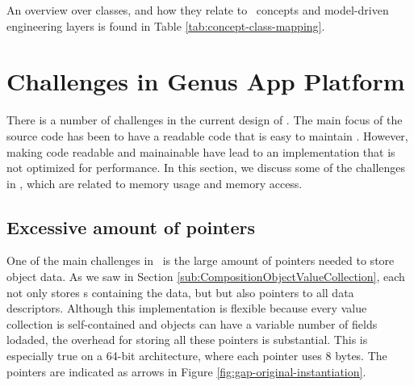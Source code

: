 An overview over classes, and how they relate to \gap~concepts and model-driven engineering layers is found in Table \ref{tab:concept-class-mapping}.

\section{Challenges in Genus App Platform}
\label{sec:Challenges in Genus App Platform}
There is a number of challenges in the current design of \gap. The main focus of the source code has been to have a readable code that is easy to maintain . However, making code readable and mainainable have lead to an implementation that is not optimized for performance. In this section, we discuss some of the challenges in \gap, which are related to memory usage and memory access.

\subsection{Excessive amount of pointers}
\label{sub:Excessive amount of pointers}
One of the main challenges in \gap~is the large amount of pointers needed to store object data. As we saw in Section \ref{sub:CompositionObjectValueCollection}, each  not only stores s containing the data, but but also pointers to all data descriptors. Although this implementation is flexible because every value collection is self-contained and objects can have a variable number of fields lodaded, the overhead for storing all these pointers is substantial. This is especially true on a 64-bit architecture, where each pointer uses 8 bytes. The pointers are indicated as arrows in Figure \ref{fig:gap-original-instantiation}.


